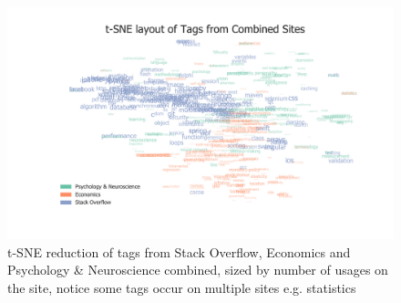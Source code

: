 \documentclass[12pt, a4paper]{article}
\begin{document}
\begin{figure}[H]
	\centering
	\begin{adjustbox}{center}
		\includegraphics[height=.5\textheight]{tsne_combined}
	\end{adjustbox}
	\caption{t-SNE reduction of tags from Stack Overflow, Economics and Psychology \& Neuroscience combined, sized by number of usages on the site, notice some tags occur on multiple sites e.g. statistics}\label{tsne_combined}
\end{figure}
\end{document}

